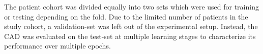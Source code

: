 The patient cohort was divided equally into two sets which were used for training or testing depending on the fold. Due to the limited number of patients in the study cohort, a validation-set was left out of the experimental setup. Instead, the CAD was evaluated on the test-set at multiple learning stages to characterize its performance over multiple epochs.  

